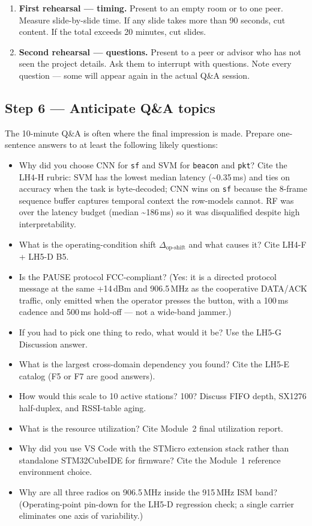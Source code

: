 \documentclass[11pt,letterpaper]{article}
\begin{document}
\begin{enumerate}[leftmargin=2em]
	\item \textbf{First rehearsal --- timing.} Present to an empty room or to one peer. Measure slide-by-slide time. If any slide takes more than 90 seconds, cut content. If the total exceeds 20 minutes, cut slides.
	\item \textbf{Second rehearsal --- questions.} Present to a peer or advisor who has not seen the project details. Ask them to interrupt with questions. Note every question --- some will appear again in the actual \mbox{Q\&A} session.
\end{enumerate}

\subsection{Step 6 --- Anticipate Q\&A topics}
The 10-minute \mbox{Q\&A} is often where the final impression is made. Prepare one-sentence answers to at least the following likely questions:

\begin{itemize}[leftmargin=2em]
	\item Why did you choose CNN for \texttt{sf} and SVM for \texttt{beacon} and \texttt{pkt}? Cite the LH4-H rubric: SVM has the lowest median latency (\textasciitilde{}0.35\,ms) and ties on accuracy when the task is byte-decoded; CNN wins on \texttt{sf} because the 8-frame sequence buffer captures temporal context the row-models cannot. RF was over the latency budget (median \textasciitilde{}186\,ms) so it was disqualified despite high interpretability.
	\item What is the operating-condition shift $\Delta_{\text{op-shift}}$ and what causes it? Cite LH4-F + LH5-D B5.
	\item Is the PAUSE protocol FCC-compliant? (Yes: it is a directed protocol message at the same +14\,dBm and 906.5\,MHz as the cooperative DATA/ACK traffic, only emitted when the operator presses the button, with a 100\,ms cadence and 500\,ms hold-off --- not a wide-band jammer.)
	\item If you had to pick one thing to redo, what would it be? Use the LH5-G Discussion answer.
	\item What is the largest cross-domain dependency you found? Cite the LH5-E catalog (F5 or F7 are good answers).
	\item How would this scale to 10 active stations? 100? Discuss FIFO depth, SX1276 half-duplex, and RSSI-table aging.
	\item What is the \FPGA{} resource utilization? Cite Module~2 final utilization report.
	\item Why did you use VS Code with the STMicro extension stack rather than standalone STM32CubeIDE for firmware? Cite the Module~1 reference environment choice.
	\item Why are all three radios on 906.5\,MHz inside the 915\,MHz ISM band? (Operating-point pin-down for the LH5-D regression check; a single carrier eliminates one axis of variability.)
\end{itemize}
\end{document}
